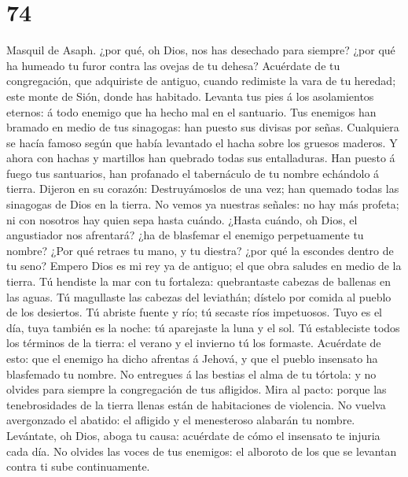 \hypertarget{section-73}{%
\section{74}\label{section-73}}

 Masquil de Asaph. ¿por qué, oh Dios, nos has desechado
para siempre? ¿por qué ha humeado tu furor contra las ovejas de tu
dehesa?  Acuérdate de tu congregación, que adquiriste de
antiguo, cuando redimiste la vara de tu heredad; este monte de Sión,
donde has habitado.  Levanta tus pies á los asolamientos
eternos: á todo enemigo que ha hecho mal en el santuario. 
Tus enemigos han bramado en medio de tus sinagogas: han puesto sus
divisas por señas.  Cualquiera se hacía famoso según que
había levantado el hacha sobre los gruesos maderos.  Y
ahora con hachas y martillos han quebrado todas sus entalladuras.
 Han puesto á fuego tus santuarios, han profanado el
tabernáculo de tu nombre echándolo á tierra.  Dijeron en
su corazón: Destruyámoslos de una vez; han quemado todas las sinagogas
de Dios en la tierra.  No vemos ya nuestras señales: no
hay más profeta; ni con nosotros hay quien sepa hasta cuándo.
 ¿Hasta cuándo, oh Dios, el angustiador nos afrentará?
¿ha de blasfemar el enemigo perpetuamente tu nombre? 
¿Por qué retraes tu mano, y tu diestra? ¿por qué la escondes dentro de
tu seno?  Empero Dios es mi rey ya de antiguo; el que
obra saludes en medio de la tierra.  Tú hendiste la mar
con tu fortaleza: quebrantaste cabezas de ballenas en las aguas.
 Tú magullaste las cabezas del leviathán; dístelo por
comida al pueblo de los desiertos.  Tú abriste fuente y
río; tú secaste ríos impetuosos.  Tuyo es el día, tuya
también es la noche: tú aparejaste la luna y el sol.  Tú
estableciste todos los términos de la tierra: el verano y el invierno tú
los formaste.  Acuérdate de esto: que el enemigo ha dicho
afrentas á Jehová, y que el pueblo insensato ha blasfemado tu nombre.
 No entregues á las bestias el alma de tu tórtola: y no
olvides para siempre la congregación de tus afligidos. 
Mira al pacto: porque las tenebrosidades de la tierra llenas están de
habitaciones de violencia.  No vuelva avergonzado el
abatido: el afligido y el menesteroso alabarán tu nombre.
 Levántate, oh Dios, aboga tu causa: acuérdate de cómo el
insensato te injuria cada día.  No olvides las voces de
tus enemigos: el alboroto de los que se levantan contra ti sube
continuamente.

